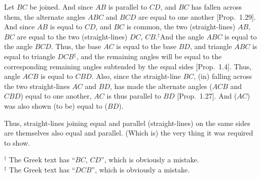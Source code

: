 \begin{Parallel}{}{}
{Let $BC$ be joined. And since $AB$ is parallel to $CD$, and $BC$ has
fallen across them, the alternate angles $ABC$ and $BCD$ are equal to one another [Prop.~1.29]. And since $AB$ is equal to $CD$, and $BC$ is common,
the two (straight-lines) $AB$, $BC$ are equal to the two (straight-lines)
$DC$, $CB$.$^\dag$And the angle $ABC$ is equal to the angle $BCD$. Thus, the
base $AC$ is equal to the base $BD$, and triangle $ABC$ is equal to triangle
$DCB$$^\ddag$, and the remaining angles will be equal to the corresponding remaining
angles subtended by the equal sides [Prop.~1.4]. Thus,  angle $ACB$ 
is equal to $CBD$. Also, since the straight-line $BC$, (in) falling across the two
straight-lines $AC$ and $BD$, has made the alternate angles  ($ACB$ and $CBD$) equal to one another,
$AC$ is thus parallel to $BD$ [Prop.~1.27]. And ($AC$) was also shown (to be) equal
to ($BD$).

Thus, straight-lines joining equal and parallel (straight-lines) on the same sides
are  themselves also equal and parallel. (Which is) the very thing it was
required to show.}
\end{Parallel}
{\footnotesize \noindent$^\dag$ The Greek text has ``$BC$, $CD$'', which is obviously a mistake.} \\
{\footnotesize \noindent$^\ddag$ The Greek text has ``$DCB$'', which is obviously a mistake.} 

